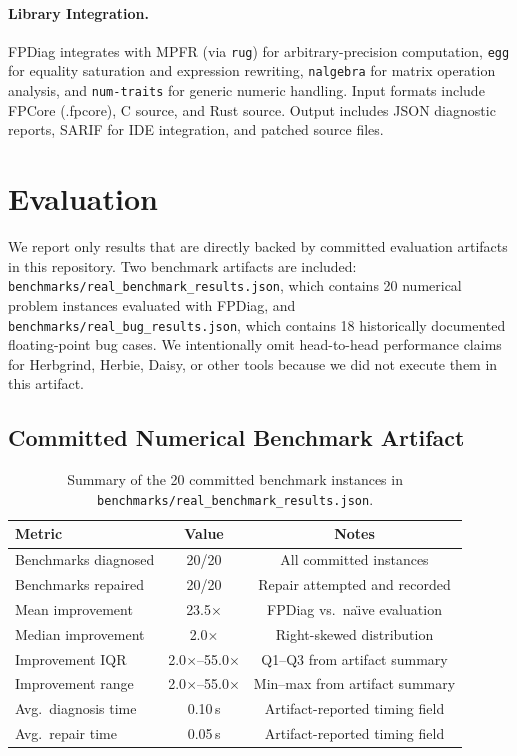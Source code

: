 \documentclass[11pt]{article}
\begin{document}
\paragraph{Library Integration.} FPDiag integrates with MPFR (via \texttt{rug}) for arbitrary-precision computation, \texttt{egg} for equality saturation and expression rewriting, \texttt{nalgebra} for matrix operation analysis, and \texttt{num-traits} for generic numeric handling. Input formats include FPCore (.fpcore), C source, and Rust source. Output includes JSON diagnostic reports, SARIF for IDE integration, and patched source files.

\section{Evaluation}
\label{sec:eval}

We report only results that are directly backed by committed evaluation
artifacts in this repository. Two benchmark artifacts are included:
\texttt{benchmarks/real\_benchmark\_results.json}, which contains 20 numerical
problem instances evaluated with FPDiag, and
\texttt{benchmarks/real\_bug\_results.json}, which contains 18 historically
documented floating-point bug cases. We intentionally omit head-to-head
performance claims for Herbgrind, Herbie, Daisy, or other tools because we did
not execute them in this artifact.

\subsection{Committed Numerical Benchmark Artifact}

\begin{table}[t]
\centering
\caption{Summary of the 20 committed benchmark instances in
\texttt{benchmarks/real\_benchmark\_results.json}.}
\begin{tabular}{lcc}
\toprule
\textbf{Metric} & \textbf{Value} & \textbf{Notes} \\
\midrule
Benchmarks diagnosed & 20/20 & All committed instances \\
Benchmarks repaired & 20/20 & Repair attempted and recorded \\
Mean improvement & 23.5$\times$ & FPDiag vs.\ na\"{\i}ve evaluation \\
Median improvement & 2.0$\times$ & Right-skewed distribution \\
Improvement IQR & 2.0$\times$--55.0$\times$ & Q1--Q3 from artifact summary \\
Improvement range & 2.0$\times$--55.0$\times$ & Min--max from artifact summary \\
Avg.\ diagnosis time & 0.10\,s & Artifact-reported timing field \\
Avg.\ repair time & 0.05\,s & Artifact-reported timing field \\
\bottomrule
\end{tabular}
\end{table}
\end{document}
